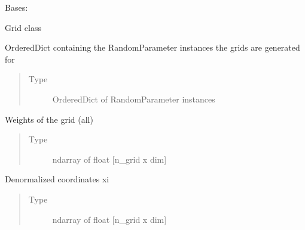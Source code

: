 \documentclass[letterpaper,10pt,english,openany,oneside]{sphinxmanual}
\begin{document}
\begin{fulllineitems}
\label{\detokenize{pygpc:pygpc.Grid.Grid}}
Bases: 

Grid class

\begin{fulllineitems}
\label{\detokenize{pygpc:pygpc.Grid.Grid.parameters_random}}
OrderedDict containing the RandomParameter instances the grids are generated for
\begin{quote}\begin{description}
\item[{Type}] \leavevmode
OrderedDict of RandomParameter instances

\end{description}\end{quote}

\end{fulllineitems}


\begin{fulllineitems}
\label{\detokenize{pygpc:pygpc.Grid.Grid._weights}}
Weights of the grid (all)
\begin{quote}\begin{description}
\item[{Type}] \leavevmode
ndarray of float {[}n\_grid x dim{]}

\end{description}\end{quote}

\end{fulllineitems}


\begin{fulllineitems}
\label{\detokenize{pygpc:pygpc.Grid.Grid._coords}}
Denormalized coordinates xi
\begin{quote}\begin{description}
\item[{Type}] \leavevmode
ndarray of float {[}n\_grid x dim{]}


\end{description}
\end{quote}
\end{fulllineitems}
\end{fulllineitems}
\end{document}

